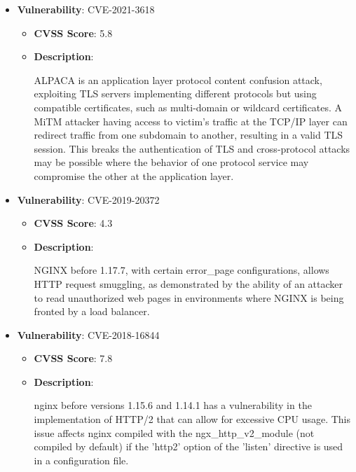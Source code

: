 \documentclass{article}
\begin{document}
\begin{itemize}
        \item \textbf{Vulnerability}: CVE-2021-3618
        \begin{itemize}
            \item \textbf{CVSS Score}:  5.8 
            \item \textbf{Description}:
            \parbox[t]{0.9\linewidth}{
                \ttfamily ALPACA is an application layer protocol content confusion attack, exploiting TLS servers implementing different protocols but using compatible certificates, such as multi-domain or wildcard certificates. A MiTM attacker having access to victim's traffic at the TCP/IP layer can redirect traffic from one subdomain to another, resulting in a valid TLS session. This breaks the authentication of TLS and cross-protocol attacks may be possible where the behavior of one protocol service may compromise the other at the application layer.
            }
        \end{itemize}
    
        \item \textbf{Vulnerability}: CVE-2019-20372
        \begin{itemize}
            \item \textbf{CVSS Score}:  4.3 
            \item \textbf{Description}:
            \parbox[t]{0.9\linewidth}{
                \ttfamily NGINX before 1.17.7, with certain error\_page configurations, allows HTTP request smuggling, as demonstrated by the ability of an attacker to read unauthorized web pages in environments where NGINX is being fronted by a load balancer.
            }
        \end{itemize}
    
        \item \textbf{Vulnerability}: CVE-2018-16844
        \begin{itemize}
            \item \textbf{CVSS Score}:  7.8 
            \item \textbf{Description}:
            \parbox[t]{0.9\linewidth}{
                \ttfamily nginx before versions 1.15.6 and 1.14.1 has a vulnerability in the implementation of HTTP/2 that can allow for excessive CPU usage. This issue affects nginx compiled with the ngx\_http\_v2\_module (not compiled by default) if the 'http2' option of the 'listen' directive is used in a configuration file.
            }
        \end{itemize}
    

\end{itemize}
\end{document}
